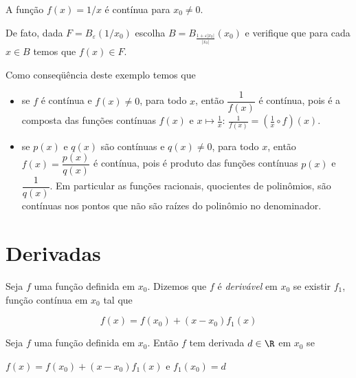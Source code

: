 \documentclass[11pt, oneside, a4paper]{gsm-l}
\begin{document}
\begin{exem}
  A função $f(x)=1\slash x$ é contínua para $x_0\ne 0$.

  De fato, dada $F=B_\varepsilon(1\slash x_0)$ escolha
  $B=B_{\frac{1+\varepsilon|x_0|}{|x_0|}}(x_0)$ e verifique que para
  cada $x\in B$ temos que $f(x)\in F$.
\end{exem}

\begin{obs}
  Como conseqüência deste exemplo temos que 
  \begin{itemize}
    \item se $f$ é contínua e $f(x)\ne 0$, para todo $x$, então
    $\dfrac{1}{f(x)}$ é contínua, pois é a composta das funções
    contínuas $f(x)$ e $x\mapsto \frac{1}{x}$:
    $\frac{1}{f(x)}=\left(\frac{1}{x}\circ f\right)(x)$.
    \item se $p(x)$ e $q(x)$ são contínuas e $q(x)\ne 0$, para todo $x$,
    então $f(x)=\dfrac{p(x)}{q(x)}$ é contínua, pois é produto das
    funções contínuas $p(x)$ e $\dfrac{1}{q(x)}$. Em particular as
    funções racionais, quocientes de polinômios, são contínuas nos
    pontos que não são raízes do polinômio no denominador.
  \end{itemize}
\end{obs}

\section{Derivadas}\label{revcalc:deriv}

\begin{defi}
Seja $f$ uma função definida em $x_0 $. Dizemos que $f$ é \textit{derivável} em $x_0 $ se existir $f_1 $, função contínua em $x_0 $ tal que

\[\boxed{
f\left( x \right) = f\left( {x_0 } \right) + \left( {x - x_0 } \right)f_1
\left( x \right)}
\]

\end{defi}

\begin{defi}

Seja $f$ uma função definida em $x_0 $. Então $f$ tem derivada
$d \in \R$ em $x_0 $ se

$f\left( x \right) = f\left( {x_0 } \right) + \left( {x - x_0 } \right)f_1
\left( x \right)$ e $f_1 \left( {x_0 } \right) = d$

\end{defi}

\newpage 
\end{document}
